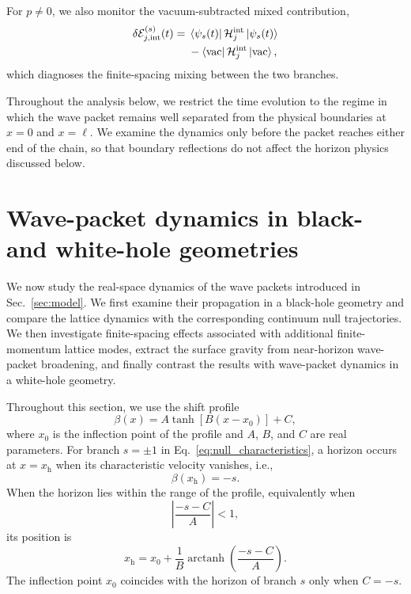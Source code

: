 \documentclass[reprint,amsmath,amssymb,aps,showkeys,superscriptaddress]{revtex4-2}
\begin{document}
For $p\neq0$, we also monitor the vacuum-subtracted mixed
contribution,
\begin{equation}
\begin{aligned}
  \delta\mathcal{E}_{j,\mathrm{int}}^{(s)}(t)
  ={}&
  \bra{\psi_s(t)}
  \mathcal{H}_j^{\mathrm{int}}
  \ket{\psi_s(t)}
  \\
  &-
  \bra{\mathrm{vac}}
  \mathcal{H}_j^{\mathrm{int}}
  \ket{\mathrm{vac}},
\end{aligned}
  \label{eq:mixed_energy}
\end{equation}
which diagnoses the finite-spacing mixing between the two branches.

Throughout the analysis below, we restrict the time evolution to
the regime in which the wave packet remains well separated from the
physical boundaries at $x=0$ and $x=\ell$. We examine the dynamics
only before the packet reaches either end of the chain, so that
boundary reflections do not affect the horizon physics discussed
below.

\section{Wave-packet dynamics in black- and white-hole geometries}
\label{sec:dynamics}

We now study the real-space dynamics of the wave packets introduced
in Sec.~\ref{sec:model}. We first examine their propagation in a
black-hole geometry and compare the lattice dynamics with the
corresponding continuum null trajectories. We then investigate
finite-spacing effects associated with additional finite-momentum
lattice modes, extract the surface gravity from near-horizon
wave-packet broadening, and finally contrast the results with
wave-packet dynamics in a white-hole geometry.

Throughout this section, we use the shift profile
\begin{equation}
  \beta(x)
  =
  A\tanh\left[B(x-x_0)\right]+C,
  \label{eq:beta_profile}
\end{equation}
where $x_0$ is the inflection point of the profile and $A$, $B$,
and $C$ are real parameters. For branch $s=\pm1$ in
Eq.~\eqref{eq:null_characteristics}, a horizon occurs at
$x=x_{\mathrm h}$ when its characteristic velocity vanishes, i.e.,
\begin{equation}
  \beta(x_{\mathrm h})=-s.
  \label{eq:general_horizon_condition}
\end{equation}
When the horizon lies within the range of the profile, equivalently
when
\begin{equation}
  \left|
    \frac{-s-C}{A}
  \right|
  <1,
\end{equation}
its position is
\begin{equation}
  x_{\mathrm h}
  =
  x_0
  +
  \frac{1}{B}
  \operatorname{arctanh}
  \left(
    \frac{-s-C}{A}
  \right).
  \label{eq:horizon_position}
\end{equation}
The inflection point $x_0$ coincides with the horizon of branch $s$
only when $C=-s$.
\end{document}
